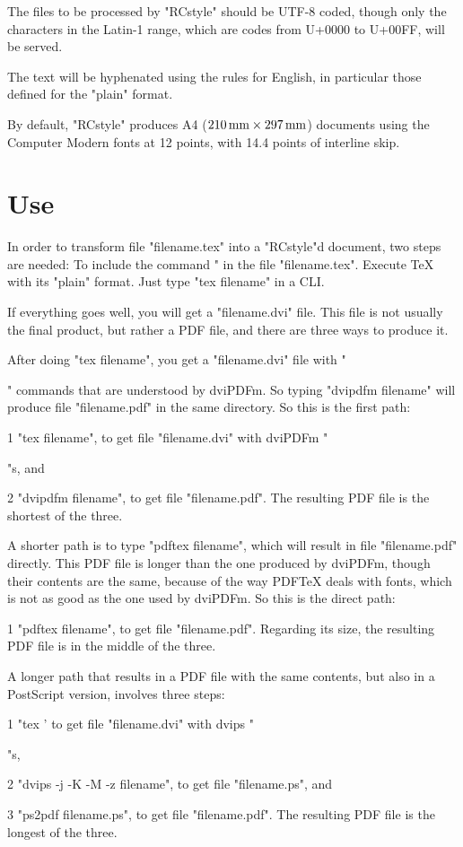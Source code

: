 The files to be processed by "RCstyle" should be
UTF-8 coded, though only the characters in the Latin-1 range,
which are codes from U+0000 to U+00FF,
will be served.

The text will be hyphenated using the rules for English,
in particular those defined for the "plain" format.

By default, "RCstyle" produces
 A4 ($210\,\hbox{mm}\times297\,\hbox{mm}$) documents
using the Computer Modern fonts at 12 points,
with 14.4 points of interline skip.


\section{Use}

In order to transform file "filename.tex"
into a "RCstyle"d document,
two steps are needed:
\beginpoints
\point To include the command "
       in the file "filename.tex".
\point Execute {\TeX} with its "plain" format.
       Just type "tex filename" in a CLI.
\endpoints

If everything goes well, you will get a "filename.dvi" file.
This file is not usually the final product,
but rather a PDF file, and there are three ways to produce it.

After doing "tex filename", you get a "filename.dvi" file
with "\special" commands that are understood by dviPDFm.
So typing "dvipdfm filename" will produce file
"filename.pdf" in the same directory.
So this is the first path:
\beginpoints
\item{1} "tex filename",
 to get file "filename.dvi" with dviPDFm "\special"s, and
\item{2} "dvipdfm filename",
 to get file "filename.pdf".
\endpoints
The resulting PDF file is the shortest of the three.

A shorter path is to type "pdftex filename",
which will result in file "filename.pdf" directly.
This PDF file is longer than the one produced by dviPDFm,
though their contents are the same,
because of the way PDF{\TeX} deals with fonts,
which is not as good as the one used by dviPDFm.
So this is the direct path:
\beginpoints
\item{1} "pdftex filename",
 to get file "filename.pdf".
\endpoints
Regarding its size,
the resulting PDF file is in the middle of the three.

A longer path that results in a PDF file with the same
contents, but also in a PostScript version, involves three steps:
\beginpoints
\item{1} "tex '\let\dvips\relax 
 to get file "filename.dvi" with dvips "\special"s,
\item{2} "dvips -j -K -M -z filename",
 to get file "filename.ps", and
\item{3} "ps2pdf filename.ps",
 to get file "filename.pdf".
\endpoints
The resulting PDF file is the longest of the three.


